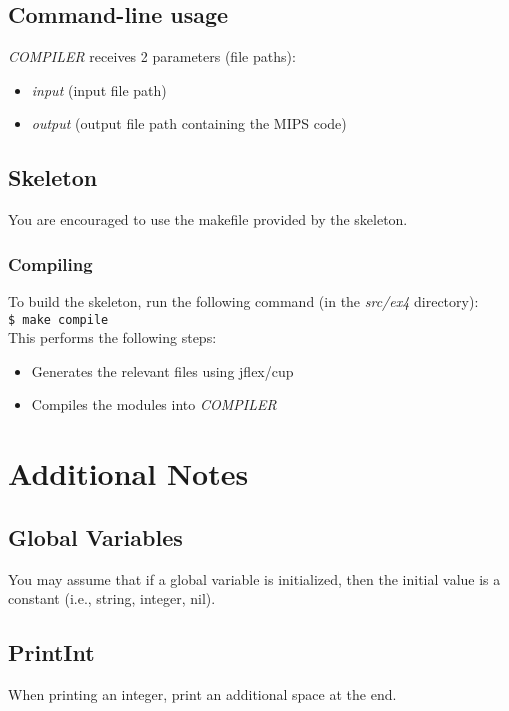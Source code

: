 \documentclass{article}
\begin{document}
\subsection{Command-line usage}
\textit{COMPILER} receives 2 parameters (file paths):
\begin{itemize}
    \item \textit{input} (input file path)
    \item \textit{output} (output file path containing the MIPS code)
\end{itemize}

\subsection{Skeleton}
You are encouraged to use the makefile provided by the skeleton.
\subsubsection{Compiling}
To build the skeleton, run the following command (in the \textit{src/ex4} directory): \\
\texttt{\$ make compile} \\
This performs the following steps:
\begin{itemize}
    \item Generates the relevant files using jflex/cup
    \item Compiles the modules into \textit{COMPILER}
\end{itemize}

%

\section{Additional Notes}
\subsection{Global Variables}
You may assume that if a global variable is initialized,
then the initial value is a constant (i.e., string, integer, nil).
\subsection{PrintInt}
When printing an integer, print an additional space at the end.
\end{document}
